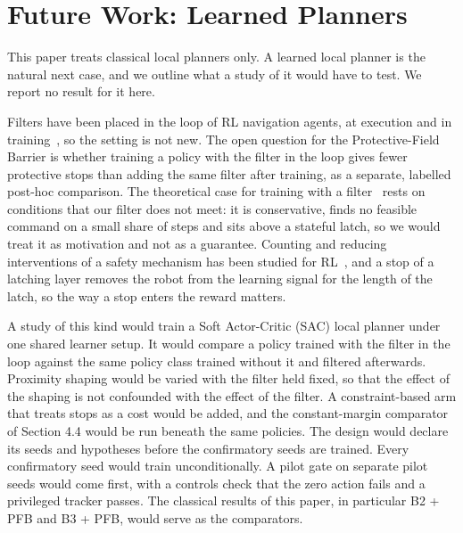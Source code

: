 \section{Future Work: Learned Planners}

This paper treats classical local planners only. A learned local planner is the natural next case, and we outline what a study of it would have to test. We report no result for it here.

Filters have been placed in the loop of RL navigation agents, at execution and in training~\cite{wang2022,yang2026cbfrl}, so the setting is not new. The open question for the Protective-Field Barrier is whether training a policy with the filter in the loop gives fewer protective stops than adding the same filter after training, as a separate, labelled post-hoc comparison. The theoretical case for training with a filter~\cite{oh2026} rests on conditions that our filter does not meet: it is conservative, finds no feasible command on a small share of steps and sits above a stateful latch, so we would treat it as motivation and not as a guarantee. Counting and reducing interventions of a safety mechanism has been studied for RL~\cite{thumm2023}, and a stop of a latching layer removes the robot from the learning signal for the length of the latch, so the way a stop enters the reward matters.

A study of this kind would train a Soft Actor-Critic (SAC) local planner \cite{haarnoja2018sac} under one shared learner setup. It would compare a policy trained with the filter in the loop against the same policy class trained without it and filtered afterwards. Proximity shaping would be varied with the filter held fixed, so that the effect of the shaping is not confounded with the effect of the filter. A constraint-based arm that treats stops as a cost \cite{stooke2020pid} would be added, and the constant-margin comparator of Section 4.4 would be run beneath the same policies. The design would declare its seeds and hypotheses before the confirmatory seeds are trained. Every confirmatory seed would train unconditionally. A pilot gate on separate pilot seeds would come first, with a controls check that the zero action fails and a privileged tracker passes. The classical results of this paper, in particular B2 + PFB and B3 + PFB, would serve as the comparators. 
